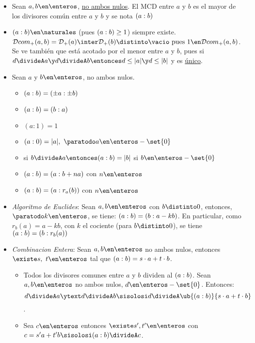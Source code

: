 \begin{itemize}
  \item Sean $a,b \en \enteros$, \underline{no ambos nulos}. El MCD entre $a$ y $b$ es el mayor de los divisores
        común entre $a$ y $b$ y se nota $(a:b)$

  \item $\mcd \en \naturales$ (pues $(a:b) \geq 1$) siempre existe.
        $\D com_+(a,b) = \D_+(a) \inter \D_+(b) \distinto \vacio
          \text{ pues } 1 \en \D com_+(a,b)$.
        Se ve también que está acotado por el menor entre $a$ y $b$, pues si
        $d \divideA a \y d \divideA b \entonces d \leq |a| \y d \leq|b|$ y es \underline{único}.

  \item Sean $a$ y $b \en \enteros$, no ambos nulos.\\
        \begin{itemize}
          \item $(a:b) = (\pm a : \pm b)$
          \item $(a:b) = (b:a)$
          \item $(a:1) = 1$
          \item $(a:0) = |a|,\ \paratodo a \en \enteros -\set{0}$
          \item si $b \divideA a \entonces \mcd = |b|$ si $b \en \enteros - \set{0}$
          \item $(a:b) = (a: b+na)$ con $n \en \enteros$
          \item $(a:b) = (a: r_a(b))$ con $n \en \enteros$
        \end{itemize}

  \item \textit{Algoritmo de Euclides}:
        Sean $a, b \en \enteros$ con $b \distinto 0$, entonces, $\paratodo k \en \enteros$, se tiene:
        $(a:b) = (b:a-kb)$. En particular, como $r_b(a) = a-kb$, con $k$ el cociente (para $b\distinto 0$), se tiene
        $(a:b) = (b: r_b(a))$

  \item \textit{Combinacion Entera}:
        Sean $a,b \en \enteros$ no ambos nulos, entonces $\existe s,\ t \en \enteros$ tal que $(a:b) = s\cdot a + t \cdot b$.
        \begin{itemize}
          \item Todos los divisores comunes entre $a$ y $b$ dividen al $(a:b)$. Sean $a,b \en \enteros$ no ambos nulos, $d \en \enteros - \set{0}$. Entonces:
                \[
                  d \divideA a \ytext d \divideA b \sisolosi d \divideA \ub{\mcd}{\cz}
                \].
          \item Sea $c \en \enteros$ entonces $\existe s', t' \en \enteros$ con $c = s'a + t'b \sisolosi \mcd \divideA c$.


\end{itemize}
\end{itemize}
